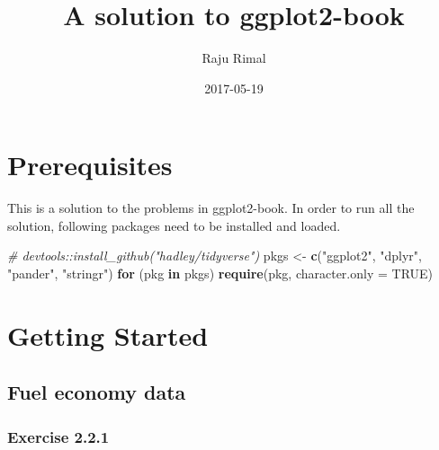 \documentclass[]{book}
\title{A solution to ggplot2-book}
\author{Raju Rimal}
\date{2017-05-19}
\newenvironment{Shaded}{\begin{snugshade}}{\end{snugshade}}
\newcommand{\KeywordTok}[1]{\textcolor[rgb]{0.13,0.29,0.53}{\textbf{#1}}}
\newcommand{\DataTypeTok}[1]{\textcolor[rgb]{0.13,0.29,0.53}{#1}}
\newcommand{\StringTok}[1]{\textcolor[rgb]{0.31,0.60,0.02}{#1}}
\newcommand{\CommentTok}[1]{\textcolor[rgb]{0.56,0.35,0.01}{\textit{#1}}}
\newcommand{\OtherTok}[1]{\textcolor[rgb]{0.56,0.35,0.01}{#1}}
\newcommand{\ControlFlowTok}[1]{\textcolor[rgb]{0.13,0.29,0.53}{\textbf{#1}}}
\newcommand{\NormalTok}[1]{#1}
\begin{document}
\maketitle

{
\hypersetup{linkcolor=black}
\setcounter{tocdepth}{1}
\tableofcontents
}
\chapter*{Prerequisites}\label{prerequisites}

This is a solution to the problems in ggplot2-book. In order to run all
the solution, following packages need to be installed and loaded.

\begin{Shaded}
\begin{Highlighting}[]
\CommentTok{# devtools::install_github("hadley/tidyverse")}
\NormalTok{pkgs <-}\StringTok{ }\KeywordTok{c}\NormalTok{(}\StringTok{"ggplot2"}\NormalTok{, }\StringTok{"dplyr"}\NormalTok{, }\StringTok{"pander"}\NormalTok{, }\StringTok{"stringr"}\NormalTok{)}
\ControlFlowTok{for}\NormalTok{ (pkg }\ControlFlowTok{in}\NormalTok{ pkgs) }\KeywordTok{require}\NormalTok{(pkg, }\DataTypeTok{character.only =} \OtherTok{TRUE}\NormalTok{)}
\end{Highlighting}
\end{Shaded}

\chapter{Getting Started}\label{getting-started}

\section{Fuel economy data}\label{fuel-economy-data}

\subsection{Exercise 2.2.1}\label{exercise-2.2.1}
\end{document}
